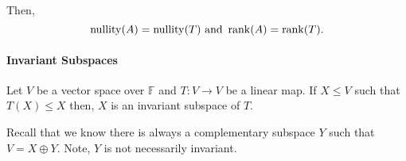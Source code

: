 Then, \[
    \mathrm{nullity}(A) = \mathrm{nullity}(T) \text{ and } \rank(A) = \rank(T)
.\]

\paragraph{Invariant Subspaces}
Let \(V\) be a vector space over \( \mathbb{F} \) and \(T: V\to V\)
be a linear map.
If \(X \leq V\) such that \(T(X) \leq X\) then, \(X\) is an invariant
subspace of \(T\).

Recall that we know there is always a complementary subspace \(Y\)
such that \(V = X \oplus Y\).
Note, \(Y\) is not necessarily invariant.


